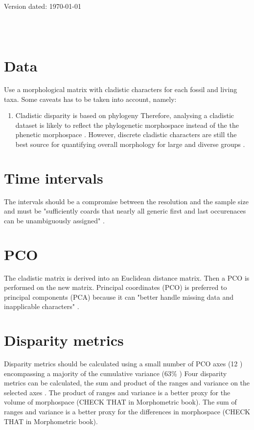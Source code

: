 \documentclass[a4paper,11pt]{article}
\begin{document}
\begin{flushright}
Version dated: \today
\end{flushright}
\begin{center}

\\
\bigskip
\\

\end{center}

\section{Data}
Use a morphological matrix with cladistic characters for each fossil and living taxa.
Some caveats has to be taken into account, namely: 
\begin{enumerate}
\item{Cladistic disparity is based on phylogeny}
Therefore, analysing a cladistic dataset is likely to reflect the phylogenetic morphospace instead of the the phenetic morphospace \citep{Foote29111996,Wagner01011997}.
However, discrete cladistic characters are still the best source for quantifying overall morphology for large and diverse groups \citep{Brusatte12092008}.
\end{enumerate}

\section{Time intervals}
The intervals should be a compromise between the resolution and the sample size and must be "sufficiently coards that nearly all generic first and last occurenaces can be unambiguously assigned" \citep{Foote01071994}.

\section{PCO}
The cladistic matrix is derived into an Euclidean distance matrix.
Then a PCO is performed on the new matrix.
Principal coordinates (PCO) is preferred to principal components (PCA) because it can "better handle missing data and inapplicable characters" \citep{lofgren2003,Wesley-Hunt2005}.

\section{Disparity metrics}
Disparity metrics should be calculated using a small number of PCO axes (12 \citep{Brusatte12092008}) encompassing a majority of the cumulative variance (63\% \citep{Brusatte12092008})
Four disparity metrics can be calculated, the sum and product of the ranges and variance on the selected axes \citep{Wills1994}.
The product of ranges and variance is a better proxy for the volume of morphospace (CHECK THAT in Morphometric book).
The sum of ranges and variance is a better proxy for the differences in morphospace (CHECK THAT in Morphometric book).
\end{document}
